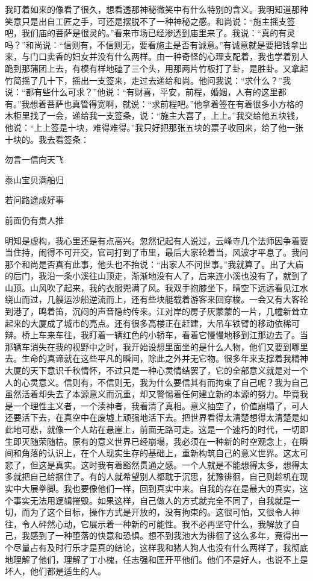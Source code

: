 \documentclass[12pt,oneside]{book}
\begin{document}
我盯着如来的像看了很久，想看透那神秘微笑中有什么特别的含义。我明知道那种笑意只是出自工匠之手，可还是摆脱不了一种神秘之感。和尚说：``施主摇支签吧，我们庙的菩萨是很灵的。''看来市场已经渗透到庙里来了。我说：``真的有灵吗？''和尚说：``信则有，不信则无，要看施主是否有诚意。''有诚意就是要把钱拿出来，与门口卖香的妇女并没有什么两样。由一种奇怪的心理支配着，我也学着别人跪到那蒲团上去，有模有样地磕了三个头，用那两片竹板打了卦，是胜卦。又拿起竹简摇了几十下，摇出一支签来，走过去递给和尚。他问我说：``求什么？''我说：``都有些什么可求？''他说：``有财喜，平安，前程，婚姻，人有的这里都有。''我想着菩萨也真管得宽啊，就说：``求前程吧。''他拿着签在有着很多小方格的木柜里找了一会，递给我一支签条，说：``施主大喜了，上上。''我交给他五块钱，他说：``上上签是十块，难得难得。''我只好把那张五块的票子收回来，给了他一张十块的。我去看签条：

勿言一信向天飞

泰山宝贝满船归

若问路途成好事

前面仍有贵人推

明知是虚构，我心里还是有点高兴。忽然记起有人说过，云峰寺几个法师因争着要当住持，闹得不可开交，官司打到了市里，最后大家轮着当，风波才平息了。我问那个和尚是否真有此事，他头也不抬说：``出家人不问世事。''我就算了。出了大庙的后门，我沿一条小溪往山顶走，渐渐地没有人了，后来连小溪也没有了，就到了山顶。山风吹了起来，我的衣服兜满了风。我双手抱膝坐下，晴空下远远看见江水绕山而过，几艘运沙船逆流而上，还有些块艇载着游客来回穿梭。一会又有大客轮到港了，鸣着笛，沉闷的声音隐约传来。江对岸的房子灰蒙蒙的一片，几幢新耸立起来的大厦成了城市的亮点。还有很多高楼正在赶建，大吊车铁臂的移动依稀可辩。桥上车来车往，我盯着一辆红色的小轿车，看着它慢慢地移到江那边去了。当那辆车消失在我的视野中之时，我开始设想里面坐的是什么人物，他们又要到哪里去。生命的真谛就在这些平凡的瞬间，除此之外并无它物。很多年来支撑着我精神大厦的天下意识千秋情怀，不过只是一种心灵情结罢了，它的全部意义就是对一个人的心灵意义。信则有，不信则无，我为什么要信其有而拘束了自己呢？我为自己虽然活着却失去了本源意义而沉重，却又警惕着任何建立新的本源的努力。毕竟我是一个理性主义者，一个渎神者，我看清了真相。意义抽空了，价值崩塌了，可人还要活下去，在真空中在废墟上顽强地活下去。把世界看得太清楚想得太清楚是如此地可悲，就像一个人站在悬崖上，前面无路可走。这是一个速朽的时代，一切即生即灭随荣随枯。原有的意义世界已经崩塌，我必须在一种新的时空观念上，在瞬间和角落的认识上，在个人现实生存的基础上，重新构筑自己的意义世界。这太可悲了，但这是真实。这时我有着豁然贯通之感。一个人就是不能想得太多，想得太多就把自己给捆住了。有的人就希望别人都耽于沉思，犹豫徘徊，自己则趁机在现实中大展拳脚。我也要像他们一样，回到真实中来。自我的存在是最大的真实，这个事实无法用逻辑摧毁。如果这样，自己做人的方式就完全不同了，自我就是一切，而为了这个目标，操作方式是开放的，没有拘束的。这很可怕，又很令人神往，令人砰然心动，它展示着一种新的可能性。我不必再坚守什么，我解放了自己，我感到了一种堕落的快意和恐惧。想不到我池大为徘徊了这么多年，竟得出一个尽量占有及时行乐才是真的结论，这样我和猪人狗人也没有什么两样了，我彻底地理解了他们，理解了丁小槐，任志强和匡开平他们。他们不是好人，也说不上是坏人，他们都是适生的人。
\end{document}
